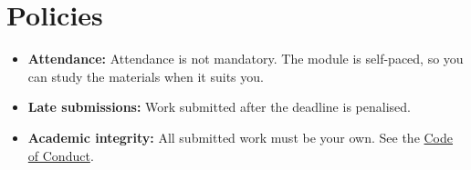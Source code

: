 \documentclass[11pt,a4paper]{article}
\begin{document}
\section{Policies}
\begin{itemize}
  \item \textbf{Attendance:} Attendance is not mandatory. The module is self-paced, so you can study the materials when it suits you.
  \item \textbf{Late submissions:} Work submitted after the deadline is penalised.
  \item \textbf{Academic integrity:} All submitted work must be your own.
        See the \href{https://wosm.academy/code-of-conduct/}{Code of Conduct}.
\end{itemize}
\end{document}
